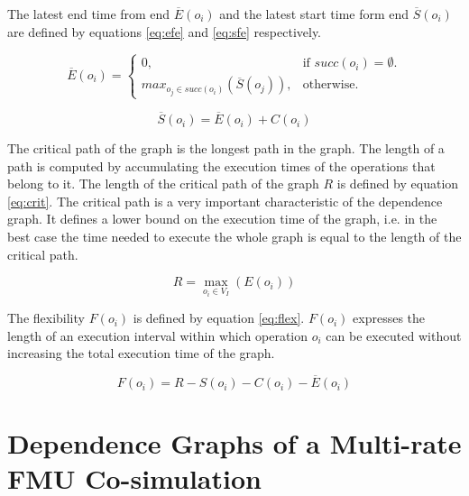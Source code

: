 The latest end time from end $\overline{E}(o_i)$ and the latest start time form end $\overline{S}(o_i)$ are defined by equations \ref{eq:efe} and \ref{eq:sfe} respectively. %

\begin{equation}
\overline{E}(o_i)=\begin{cases}
    0, & \text{if $succ(o_i)=\emptyset$}.\\
    max_{o_j \in succ(o_i)}(\overline{S}(o_j)), & \text{otherwise}.
  \end{cases}
	\label{eq:efe}
\end{equation}

\begin{equation}
	\overline{S}(o_i)=\overline{E}(o_i)+C(o_i) 
	\label{eq:sfe}
\end{equation}

The critical path of the graph is the longest path in the graph. The length of a path is computed by accumulating the execution times of the operations that belong to it. The length of the critical path of the graph $R$ is defined by equation \ref{eq:crit}. The critical path is a very important characteristic of the dependence graph. It defines a lower bound on the execution time of the graph, i.e. in the best case the time needed to execute the whole graph is equal to the length of the critical path. 

\begin{equation}
	R = \max_{o_i \in V_I}(E(o_i)) 
	\label{eq:crit}
\end{equation}
 
The flexibility $F(o_i)$ is defined by equation \ref{eq:flex}. $F(o_i)$ expresses the length of an execution interval within which operation $o_i$ can be executed without increasing the total execution time of the graph.

\begin{equation}
	F(o_i) = R - S(o_i) - C(o_i) - \overline{E}(o_i) 
	\label{eq:flex}
\end{equation}

\section{Dependence Graphs of a Multi-rate FMU Co-simulation}

